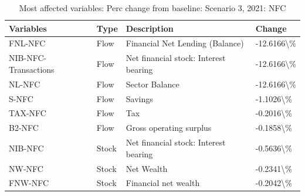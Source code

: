 \documentclass[
]{book}
\begin{document}
\begin{table}

\caption{\label{tab:most-affected-Scenario-3-perc-NFC}Most affected variables: Perc change from baseline: Scenario 3, 2021: NFC}
\centering
\fontsize{10}{12}\selectfont
\begin{tabular}[t]{l|l|l|l}
\hline
Variables & Type & Description & Change\\
\hline
FNL-NFC & Flow & Financial Net Lending (Balance) & -12.6166\textbackslash{}\%\\
\hline
NIB-NFC-Transactions & Flow & Net financial stock: Interest bearing & -12.6166\textbackslash{}\%\\
\hline
NL-NFC & Flow & Sector Balance & -12.6166\textbackslash{}\%\\
\hline
S-NFC & Flow & Savings & -1.1026\textbackslash{}\%\\
\hline
TAX-NFC & Flow & Tax & -0.2016\textbackslash{}\%\\
\hline
B2-NFC & Flow & Gross operating surplus & -0.1858\textbackslash{}\%\\
\hline
NIB-NFC & Stock & Net financial stock: Interest bearing & -0.5636\textbackslash{}\%\\
\hline
NW-NFC & Stock & Net Wealth & -0.2341\textbackslash{}\%\\
\hline
FNW-NFC & Stock & Financial net wealth & -0.2042\textbackslash{}\%\\
\hline
\end{tabular}
\end{table}
\end{document}
